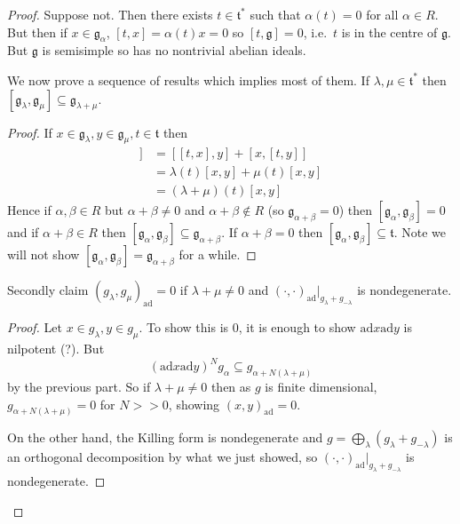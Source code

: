 \documentclass[a4paper]{article}
\newcommand*{\Lie}[1]{\mathfrak{#1}} %
\newcommand{\ad}{\mathrm{ad}} %
\begin{document}
\begin{proof}
  Suppose not. Then there exists \(t \in \Lie t^*\) such that \(\alpha(t) = 0\) for all \(\alpha \in R\). But then if \(x \in \Lie g_\alpha\), \([t, x] = \alpha(t) x = 0\) so \([t, \Lie g] = 0\), i.e.\ \(t\) is in the centre of \(\Lie g\). But \(\Lie g\) is semisimple so has no nontrivial abelian ideals.

  We now prove a sequence of results which implies most of them. If \(\lambda, \mu \in \Lie t^*\) then \([\Lie g_\lambda, \Lie g_\mu] \subseteq \Lie g_{\lambda + \mu}\).

  \begin{proof}
    If \(x \in \Lie g_\lambda, y \in \Lie g_\mu, t \in \Lie t\) then
    \begin{align*}
      [t, [x, y]] &= [[t, x], y] + [x, [t, y]] \\
                  &= \lambda(t) [x, y] + \mu(t) [x, y] \\
                  &= (\lambda + \mu) (t) [x, y]
    \end{align*}
    Hence if \(\alpha, \beta \in R\) but \(\alpha + \beta \neq 0\) and \(\alpha + \beta \notin R\) (so \(\Lie g_{\alpha + \beta} = 0\)) then \([\Lie g_\alpha, \Lie g_\beta] = 0\) and if \(\alpha + \beta \in R\) then \([\Lie g_\alpha, \Lie g_\beta] \subseteq \Lie g_{\alpha + \beta}\). If \(\alpha + \beta = 0\) then \([\Lie g_\alpha, \Lie g_\beta] \subseteq \Lie t\). Note we will not show \([\Lie g_\alpha, \Lie g_\beta] = \Lie g_{\alpha + \beta}\) for a while.

  \end{proof}
  Secondly claim \((g_\lambda, g_\mu)_\ad = 0\) if \(\lambda + \mu \neq 0\) and \((\cdot, \cdot)_\ad|_{g_\lambda + g_{-\lambda}}\) is nondegenerate.

  \begin{proof}
    Let \(x \in g_\lambda, y \in g_\mu\). To show this is \(0\), it is enough to show \(\ad x \ad y\) is nilpotent (?). But
    \[
      (\ad x \ad y)^N g_\alpha \subseteq g_{\alpha + N(\lambda + \mu)}
    \]
    by the previous part. So if \(\lambda + \mu \neq 0\) then as \(g\) is finite dimensional, \(g_{\alpha + N(\lambda + \mu)} = 0\) for \(N >> 0\), showing \((x, y)_\ad = 0\).

    On the other hand, the Killing form is nondegenerate and \(g = \bigoplus_\lambda (g_\lambda + g_{-\lambda})\) is an orthogonal decomposition by what we just showed, so \((\cdot, \cdot)_\ad|_{g_\lambda + g_{-\lambda}}\) is nondegenerate.
  \end{proof}


\end{proof}
\end{document}
